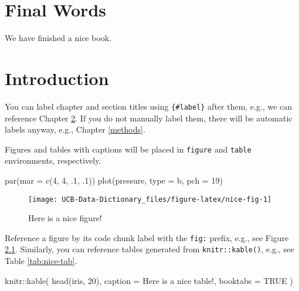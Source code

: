 \documentclass[
]{book}
\newenvironment{Shaded}{\begin{snugshade}}{\end{snugshade}}
\newcommand{\AttributeTok}[1]{\textcolor[rgb]{0.77,0.63,0.00}{#1}}
\newcommand{\ConstantTok}[1]{\textcolor[rgb]{0.00,0.00,0.00}{#1}}
\newcommand{\DecValTok}[1]{\textcolor[rgb]{0.00,0.00,0.81}{#1}}
\newcommand{\FunctionTok}[1]{\textcolor[rgb]{0.00,0.00,0.00}{#1}}
\newcommand{\NormalTok}[1]{#1}
\newcommand{\SpecialCharTok}[1]{\textcolor[rgb]{0.00,0.00,0.00}{#1}}
\newcommand{\StringTok}[1]{\textcolor[rgb]{0.31,0.60,0.02}{#1}}
\begin{document}
\hypertarget{final-words}{%
\chapter{Final Words}\label{final-words}}

We have finished a nice book.

\hypertarget{intro}{%
\chapter{Introduction}\label{intro}}

You can label chapter and section titles using \texttt{\{\#label\}} after them, e.g., we can reference Chapter \ref{intro}. If you do not manually label them, there will be automatic labels anyway, e.g., Chapter \ref{methods}.

Figures and tables with captions will be placed in \texttt{figure} and \texttt{table} environments, respectively.

\begin{Shaded}
\begin{Highlighting}[]
\FunctionTok{par}\NormalTok{(}\AttributeTok{mar =} \FunctionTok{c}\NormalTok{(}\DecValTok{4}\NormalTok{, }\DecValTok{4}\NormalTok{, .}\DecValTok{1}\NormalTok{, .}\DecValTok{1}\NormalTok{))}
\FunctionTok{plot}\NormalTok{(pressure, }\AttributeTok{type =} \StringTok{\textquotesingle{}b\textquotesingle{}}\NormalTok{, }\AttributeTok{pch =} \DecValTok{19}\NormalTok{)}
\end{Highlighting}
\end{Shaded}

\begin{figure}

{\centering \texttt{[image: UCB-Data-Dictionary\_files/figure-latex/nice-fig-1]} 

}

\caption{Here is a nice figure!}\label{fig:nice-fig}
\end{figure}

Reference a figure by its code chunk label with the \texttt{fig:} prefix, e.g., see Figure \ref{fig:nice-fig}. Similarly, you can reference tables generated from \texttt{knitr::kable()}, e.g., see Table \ref{tab:nice-tab}.

\begin{Shaded}
\begin{Highlighting}[]
\NormalTok{knitr}\SpecialCharTok{::}\FunctionTok{kable}\NormalTok{(}
  \FunctionTok{head}\NormalTok{(iris, }\DecValTok{20}\NormalTok{), }\AttributeTok{caption =} \StringTok{\textquotesingle{}Here is a nice table!\textquotesingle{}}\NormalTok{,}
  \AttributeTok{booktabs =} \ConstantTok{TRUE}
\NormalTok{)}
\end{Highlighting}
\end{Shaded}
\end{document}
